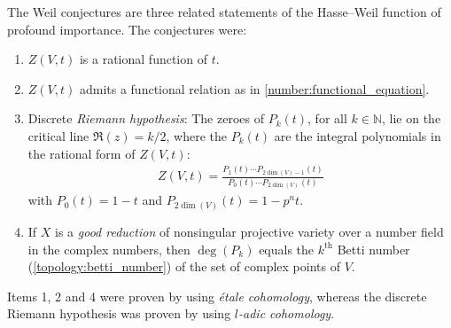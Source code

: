     \begin{remark}
        The Weil conjectures are three related statements of the Hasse--Weil function of profound importance. The conjectures were:
        \begin{enumerate}
            \item $Z(V,t)$ is a rational function of $t$.
            \item $Z(V,t)$ admits a functional relation as in \cref{number:functional_equation}.
            \item Discrete \textit{Riemann hypothesis}: The zeroes of $P_k(t)$, for all $k\in\mathbb{N}$, lie on the critical line $\Re(z)=k/2$, where the $P_k(t)$ are the integral polynomials in the rational form of $Z(V,t)$:
            \begin{gather}
                Z(V,t) = \frac{P_1(t)\cdots P_{2\dim(V)-1}(t)}{P_0(t)\cdots P_{2\dim(V)}(t)}
            \end{gather}
            with $P_0(t)=1-t$ and $P_{2\dim(V)}(t)=1-p^nt$.
            \item If $X$ is a \textit{good reduction} of nonsingular projective variety over a number field in the complex numbers, then $\deg(P_k)$ equals the $k^{\text{th}}$ Betti number (\cref{topology:betti_number}) of the set of complex points of $V$.
        \end{enumerate}
        Items 1, 2 and 4 were proven by  using \textit{\'etale cohomology}, whereas the discrete Riemann hypothesis was proven by  using \textit{$l$-adic cohomology}.
    \end{remark}


